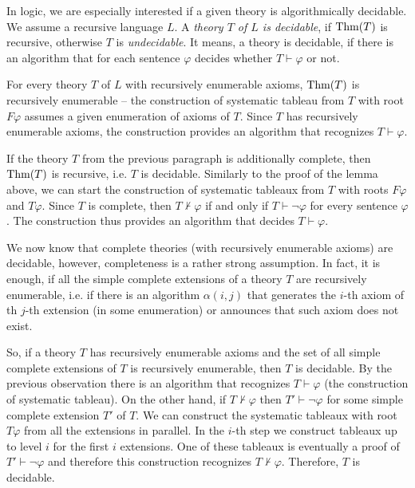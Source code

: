 In logic, we are especially interested if a given theory is algorithmically decidable. We assume a recursive language $L$. A \emph{theory $T$ of $L$ is decidable}, if $\operatorname{Thm}(T)$ is recursive, otherwise $T$ is \emph{undecidable}. It means, a theory is decidable, if there is an algorithm that for each sentence $\varphi$ decides whether $T \vdash \varphi$ or not. 

For every theory $T$ of $L$ with recursively enumerable axioms, $\operatorname{Thm}(T)$ is recursively enumerable -- the construction of systematic tableau from $T$ with root $F \varphi$ assumes a given enumeration of axioms of $T$. Since $T$ has recursively enumerable axioms, the construction provides an algorithm that recognizes $T \vdash \varphi$.

If the theory $T$ from the previous paragraph is additionally complete, then $\operatorname{Thm}(T)$ is recursive, i.e. $T$ is decidable. Similarly to the proof of the lemma above, we can start the construction of systematic tableaux from $T$ with roots $F \varphi$ and $T \varphi$. Since $T$ is complete, then $T \nvdash \varphi$ if and only if $T \vdash \neg \varphi$ for every sentence $\varphi$. The construction thus provides an algorithm that decides $T \vdash \varphi$.

We now know that complete theories (with recursively enumerable axioms) are decidable, however, completeness is a rather strong assumption. In fact, it is enough, if all the simple complete extensions of a theory $T$ are recursively enumerable, i.e. if there is an algorithm $\alpha(i,j)$ that generates the $i$-th axiom of th $j$-th extension (in some enumeration) or announces that such axiom does not exist.

So, if a theory $T$ has recursively enumerable axioms and the set of all simple complete extensions of $T$ is recursively enumerable, then $T$ is decidable. By the previous observation there is an algorithm that recognizes $T \vdash \varphi$ (the construction of systematic tableau). On the other hand, if $T \nvdash \varphi$ then $T' \vdash \neg \varphi$ for some simple complete extension $T'$ of $T$. We can construct the systematic tableaux with root $T \varphi$ from all the extensions in parallel. In the $i$-th step we construct tableaux up to level $i$ for the first $i$ extensions. One of these tableaux is eventually a proof of $T' \vdash \neg \varphi$ and therefore this construction recognizes $T \nvdash \varphi$. Therefore, $T$ is decidable.

